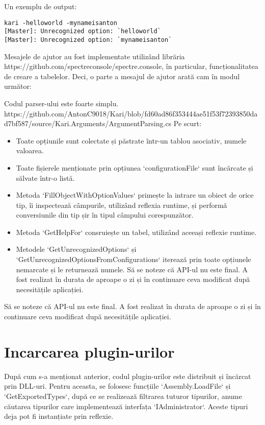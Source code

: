 \documentclass{report}
\begin{document}
Un exemplu de output:

\begin{verbatim}
kari -helloworld -mynameisanton
[Master]: Unrecognized option: `helloworld`
[Master]: Unrecognized option: `mynameisanton`
\end{verbatim}


Mesajele de ajutor au fost implementate utilizând librăria https://github.com/spectreconsole/spectre.console, în particular, funcționalitatea de creare a tabelelor.
Deci, o parte a mesajul de ajutor arată cam în modul următor:

Codul parser-ului este foarte simplu.
https://github.com/AntonC9018/Kari/blob/fd60ad86f353444ae51f53f72393850dad7bf587/source/Kari.Arguments/ArgumentParsing.cs
Pe scurt:

\begin{itemize}
  \item Toate opțiunile sunt colectate și păstrate într-un tablou asociativ, numele \rightarrow valoarea.
  \item Toate fișierele menționate prin opțiunea `configurationFile` sunt încărcate și sălvate într-o listă.
  \item Metoda `FillObjectWithOptionValues` primește la intrare un obiect de orice tip, îi inspectează câmpurile, utilizând reflexia runtime, și performă conversiunile din tip șir în tipul câmpului corespunzător.
  \item Metoda `GetHelpFor` consruiește un tabel, utilizând aceeași reflexie runtime.
  \item Metodele `GetUnrecognizedOptions` și `GetUnrecognizedOptionsFromConfigurations` iterează prin toate opțiunele nemarcate și le returnează numele.
  Să se noteze că API-ul nu este final.
  A fost realizat în durata de aproape o zi și în continuare ceva modificat după necesitățile aplicației.
\end{itemize}

Să se noteze că API-ul nu este final.
A fost realizat în durata de aproape o zi și în continuare ceva modificat după necesitățile aplicației.


\section{Incarcarea plugin-urilor}

După cum s-a menționat anterior, codul plugin-urilor este distribuit și încărcat prin DLL-uri.
Pentru aceasta, se folosesc funcțiile `Assembly.LoadFile` și `GetExportedTypes`, după ce se realizează filtrarea tuturor tipurilor, anume căutarea tipurilor care implementează interfața `IAdministrator`.
Aceste tipuri deja pot fi instanțiate prin reflexie.
\end{document}
